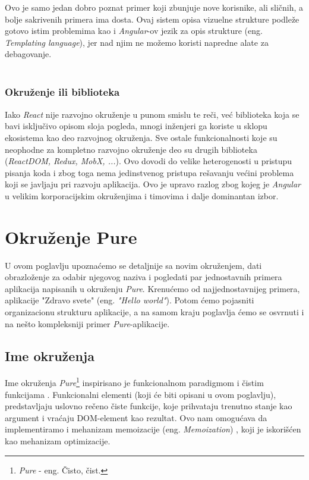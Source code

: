 \documentclass[12pt,oneside]{memoir}
\begin{document}
Ovo je samo jedan dobro poznat primer koji zbunjuje nove korisnike, ali sličnih, a bolje sakrivenih primera ima dosta.
Ovaj sistem opisa vizuelne strukture podleže gotovo istim problemima kao i \emph{Angular}-ov jezik za opis strukture (eng. \emph{Templating language}),
jer nad njim ne možemo koristi napredne alate za debagovanje.
\\
\\

\subsection{Okruženje ili biblioteka}
Iako \emph{React} nije razvojno okruženje u punom smislu te reči, već biblioteka koja se bavi isključivo opisom sloja pogleda,
mnogi inženjeri ga koriste u sklopu ekosistema kao deo razvojnog okruženja.
Sve ostale funkcionalnosti koje su neophodne za kompletno razvojno okruženje deo su drugih biblioteka (\emph{ReactDOM, Redux, MobX, ...}).
Ovo dovodi do velike heterogenosti u pristupu pisanja koda i zbog toga nema jedinstvenog pristupa rešavanju većini problema
koji se javljaju pri razvoju aplikacija. Ovo je upravo razlog zbog kojeg je \emph{Angular} u velikim korporacijskim okruženjima i timovima
i dalje dominantan izbor.
\chapter{Okruženje Pure}
U ovom poglavlju upoznaćemo se detaljnije sa novim okruženjem, dati obrazloženje
za odabir njegovog naziva i pogledati par jednostavnih primera aplikacija napisanih u okruženju \emph{Pure}.
Krenućemo od najjednostavnijeg
primera, aplikacije "Zdravo svete" (eng. \emph{"Hello world"}). Potom ćemo pojasniti organizacionu strukturu aplikacije, 
a na samom kraju poglavlja ćemo se osvrnuti i na nešto kompleksniji primer \emph{Pure}-aplikacije.
\section{Ime okruženja}

Ime okruženja \emph{Pure}\footnote{\emph{Pure} - eng. Čisto, čist.} inspirisano je 
funkcionalnom paradigmom i čistim funkcijama \cite{functionalProgramming}. Funkcionalni elementi (koji će biti opisani u ovom poglavlju),
predstavljaju uslovno rečeno čiste funkcije, koje prihvataju trenutno stanje kao argument i vraćaju
DOM-element kao rezultat. Ovo nam omogućava da implementiramo i mehanizam memoizacije (eng. \emph{Memoization}) \cite{functionalProgramming},
koji je iskorišćen kao mehanizam optimizacije.
\end{document}

